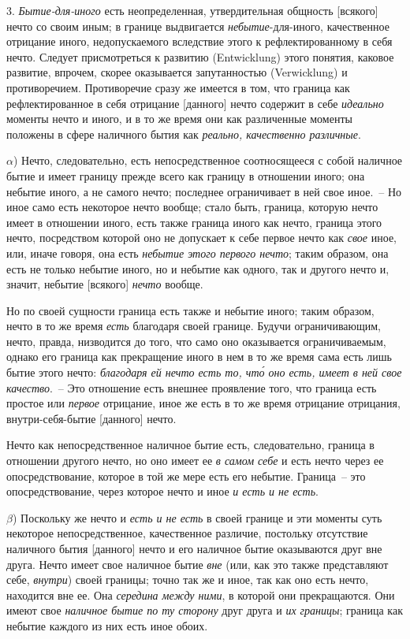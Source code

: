 3. \emph{Бытие-для-иного} есть неопределенная, утвердительная
общность [всякого] нечто со своим иным; в границе
выдвигается \emph{небытие}-для-иного, качественное отрицание
иного, недопускаемого вследствие этого к рефлектированному
в себя нечто. Следует присмотреться к развитию
(Entwicklung) этого понятия, каковое развитие, впрочем,
скорее оказывается запутанностью (Verwicklung) и противоречием.
Противоречие сразу же имеется в том, что граница
как рефлектированное в себя отрицание [данного] нечто
содержит в себе \emph{идеально} моменты нечто и иного, и в то же
время они как различенные моменты положены в сфере
наличного бытия как \emph{реально, качественно различные}.

$\alpha$) Нечто, следовательно, есть непосредственное соотносящееся
с собой наличное бытие и имеет границу прежде
всего как границу в отношении иного; она небытие
иного, а не самого нечто; последнее ограничивает в ней
свое иное.~-- Но иное само есть некоторое нечто вообще;
стало быть, граница, которую нечто имеет в отношении
иного, есть также граница иного как нечто, граница этого
нечто, посредством которой оно не допускает к себе
первое нечто как \emph{свое} иное, или, иначе говоря, она есть
\emph{небытие этого первого нечто}; таким образом, она есть не
только небытие иного, но и небытие как одного, так и
другого нечто и, значит, небытие [всякого] \emph{нечто} вообще.

Но по своей сущности граница есть также и небытие
иного; таким образом, нечто в то же время \emph{есть} благодаря
своей границе. Будучи ограничивающим, нечто,
правда, низводится до того, что само оно оказывается
ограничиваемым, однако его граница как прекращение
иного в нем в то же время сама есть лишь бытие этого
нечто: \emph{благодаря ей нечто есть то, чт\'о оно есть, имеет в
ней свое качество}.~-- Это отношение есть внешнее проявление
того, что граница есть простое или \emph{первое} отрицание,
иное же есть в то же время отрицание отрицания,
внутри-себя-бытие [данного] нечто.

Нечто как непосредственное наличное бытие есть, следовательно,
граница в отношении другого нечто, но оно
имеет ее \emph{в самом себе} и есть нечто через ее опосредствование,
которое в той же мере есть его небытие. Граница~--
это опосредствование, через которое нечто и иное
\emph{и есть и не есть}.

$\beta$) Поскольку же нечто и \emph{есть и не есть} в своей границе
и эти моменты суть некоторое непосредственное, качественное
различие, постольку отсутствие наличного
бытия [данного] нечто и его наличное бытие оказываются
друг вне друга. Нечто имеет свое наличное бытие \emph{вне}
(или, как это также представляют себе, \emph{внутри}) своей
границы; точно так же и иное, так как оно есть нечто,
находится вне ее. Она \emph{середина между ними}, в которой
они прекращаются. Они имеют свое \emph{наличное бытие по
ту сторону} друг друга и \emph{их границы}; граница как небытие
каждого из них есть иное обоих.

